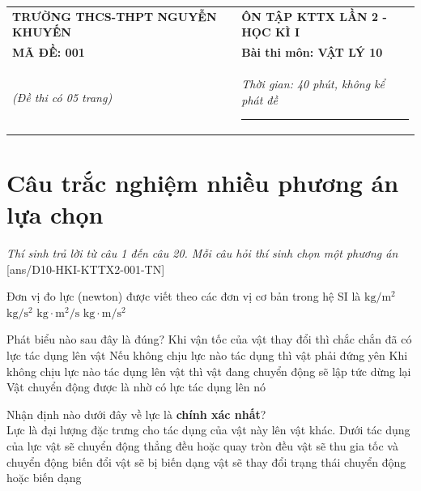 \begin{center}
	\begin{tabular}{M{10cm}M{8cm}}
		\textbf{TRƯỜNG THCS-THPT NGUYỄN KHUYẾN}& \textbf{ÔN TẬP KTTX LẦN 2 - HỌC KÌ I}\\
		\textbf{MÃ ĐỀ: 001}& \textbf{Bài thi môn: VẬT LÝ 10}\\
		\textit{(Đề thi có 05 trang)}& \textit{Thời gian: 40 phút, không kể phát đề}
		
		\noindent\rule{4cm}{0.8pt} \\
	\end{tabular}
\end{center}
\setcounter{section}{0}
\section{Câu trắc nghiệm nhiều phương án lựa chọn}
\textit{Thí sinh trả lời từ câu 1 đến câu 20. Mỗi câu hỏi thí sinh chọn một phương án}
\setcounter{ex}{0}
[ans/D10-HKI-KTTX2-001-TN]
\begin{ex}
	Đơn vị đo lực (newton) được viết theo các đơn vị cơ bản trong hệ SI là
	\choice
	{$\si{\kilogram/\meter^2}$}
	{$\si{\kilogram/\second^2}$}
	{$\si{\kilogram\cdot\meter^2/\second}$}
	{\True $\si{\kilogram\cdot\meter/\second^2}$}
	\loigiai{}
\end{ex}
\begin{ex}
	Phát biểu nào sau đây là đúng?
	\choice
	{\True Khi vận tốc của vật thay đổi thì chắc chắn đã có lực tác dụng lên vật}
	{Nếu không chịu lực nào tác dụng thì vật phải đứng yên}
	{Khi không chịu lực nào tác dụng lên vật thì vật đang chuyển động sẽ lập tức dừng lại}
	{Vật chuyển động được là nhờ có lực tác dụng lên nó}
	\loigiai{}
\end{ex}
\begin{ex}
	Nhận định nào dưới đây về lực là \textbf{chính xác nhất}?\\
	Lực là đại lượng đặc trưng cho tác dụng của vật này lên vật khác. Dưới tác dụng của lực
	\choice
	{vật sẽ chuyển động thẳng đều hoặc quay tròn đều}
	{vật sẽ thu gia tốc và chuyển động biến đổi}
	{vật sẽ bị biến dạng}
	{\True vật sẽ thay đổi trạng thái chuyển động hoặc biến dạng}
	\loigiai{}
\end{ex}

